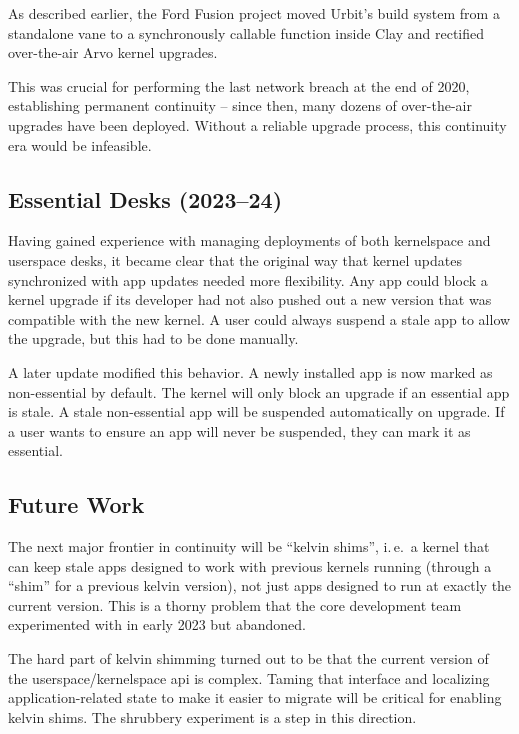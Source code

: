 \documentclass[twoside]{article}
\begin{document}
As described earlier, the Ford Fusion project moved Urbit's build system from a standalone vane to a synchronously callable function inside Clay and rectified over-the-air Arvo kernel upgrades.

\sloppy
This was crucial for performing the last network breach at the end of 2020, establishing permanent continuity – since then, many dozens of over-the-air upgrades have been deployed.  Without a reliable upgrade process, this continuity era would be infeasible.

\subsection{Essential Desks (2023–24)}

Having gained experience with managing deployments of both kernelspace and userspace desks, it became clear that the original way that kernel updates synchronized with app updates needed more flexibility.  Any app could block a kernel upgrade if its developer had not also pushed out a new version that was compatible with the new kernel.  A user could always suspend a stale app to allow the upgrade, but this had to be done manually.

A later update modified this behavior.  A newly installed app is now marked as non-essential by default.  The kernel will only block an upgrade if an essential app is stale. A stale non-essential app will be suspended automatically on upgrade.  If a user wants to ensure an app will never be suspended, they can mark it as essential.

\subsection{Future Work}

The next major frontier in continuity will be ``kelvin shims'', i.\,e.\ a kernel that can keep stale apps designed to work with previous kernels running (through a ``shim'' for a previous kelvin version), not just apps designed to run at exactly the current version.  This is a thorny problem that the core development team experimented with in early 2023 but abandoned.

The hard part of kelvin shimming turned out to be that the current version of the userspace/kernelspace {\sc api} is complex.  Taming that interface and localizing application-related state to make it easier to migrate will be critical for enabling kelvin shims.  The shrubbery experiment is a step in this direction.
\end{document}
